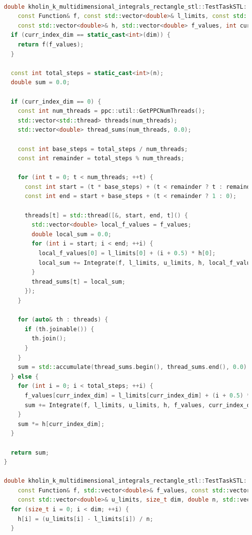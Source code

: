 \documentclass[14pt,a4paper]{article}
\begin{document}
\begin{framed}
\begin{lstlisting}[language=C++]

double kholin_k_multidimensional_integrals_rectangle_stl::TestTaskSTL::Integrate(
    const Function& f, const std::vector<double>& l_limits, const std::vector<double>& u_limits,
    const std::vector<double>& h, std::vector<double> f_values, int curr_index_dim, size_t dim, double n) {
  if (curr_index_dim == static_cast<int>(dim)) {
    return f(f_values);
  }

  const int total_steps = static_cast<int>(n);
  double sum = 0.0;

  if (curr_index_dim == 0) {
    const int num_threads = ppc::util::GetPPCNumThreads();
    std::vector<std::thread> threads(num_threads);
    std::vector<double> thread_sums(num_threads, 0.0);

    const int base_steps = total_steps / num_threads;
    const int remainder = total_steps % num_threads;

    for (int t = 0; t < num_threads; ++t) {
      const int start = (t * base_steps) + (t < remainder ? t : remainder);
      const int end = start + base_steps + (t < remainder ? 1 : 0);

      threads[t] = std::thread([&, start, end, t]() {
        std::vector<double> local_f_values = f_values;
        double local_sum = 0.0;
        for (int i = start; i < end; ++i) {
          local_f_values[0] = l_limits[0] + (i + 0.5) * h[0];
          local_sum += Integrate(f, l_limits, u_limits, h, local_f_values, 1, dim, n);
        }
        thread_sums[t] = local_sum;
      });
    }

    for (auto& th : threads) {
      if (th.joinable()) {
        th.join();
      }
    }
    sum = std::accumulate(thread_sums.begin(), thread_sums.end(), 0.0) * h[0];
  } else {
    for (int i = 0; i < total_steps; ++i) {
      f_values[curr_index_dim] = l_limits[curr_index_dim] + (i + 0.5) * h[curr_index_dim];
      sum += Integrate(f, l_limits, u_limits, h, f_values, curr_index_dim + 1, dim, n);
    }
    sum *= h[curr_index_dim];
  }

  return sum;
}

double kholin_k_multidimensional_integrals_rectangle_stl::TestTaskSTL::IntegrateWithRectangleMethod(
    const Function& f, std::vector<double>& f_values, const std::vector<double>& l_limits,
    const std::vector<double>& u_limits, size_t dim, double n, std::vector<double> h) {
  for (size_t i = 0; i < dim; ++i) {
    h[i] = (u_limits[i] - l_limits[i]) / n;
  }


\end{lstlisting}
\end{framed}
\end{document}
